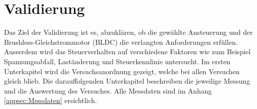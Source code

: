 \section{Validierung}\label{sec:Validierung}
Das Ziel der Validierung ist es, abzuklären, ob die gewählte Ansteuerung und der Brushless-Gleichstrommotor (BLDC) die verlangten Anforderungen erfüllen. Ausserdem wird das Steuerverhalten auf verschiedene Faktoren wie zum Beispiel Spannungsabfall, Laständerung und Steuerkennlinie untersucht.
Im ersten Unterkapitel wird die Versuchsanordnung gezeigt, welche bei allen Versuchen gleich blieb. Die darauffolgenden Unterkapitel beschreiben die jeweilige Messung und die Auswertung des Versuches.
Alle Messdaten sind im Anhang \ref{appsec:Messdaten} ersichtlich.













